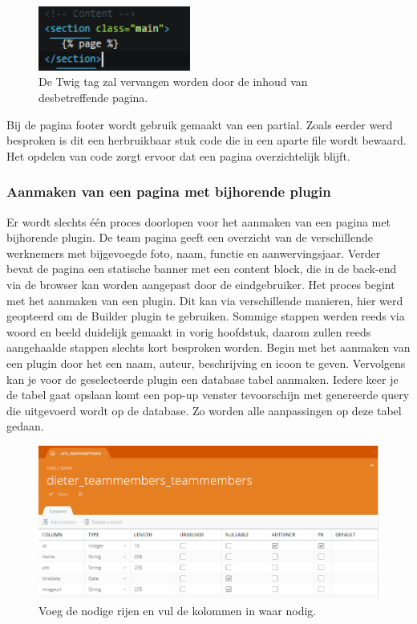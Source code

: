 \begin{figure}[!ht]
  \includegraphics[width=50mm]{img/oc-layout-page.png}
  \centering
  \caption{De Twig tag zal vervangen worden door de inhoud van desbetreffende pagina.}
  \label{fig:Variabele pagina-inhoud.}
\end{figure}

\noindent
Bij de pagina footer wordt gebruik gemaakt van een partial. Zoals eerder werd besproken is dit een herbruikbaar stuk code die in een aparte file wordt bewaard. Het opdelen van code zorgt ervoor dat een pagina overzichtelijk blijft. 


\subsubsection{Aanmaken van een pagina met bijhorende plugin}
Er wordt slechts één proces doorlopen voor het aanmaken van een pagina met bijhorende plugin. De team pagina geeft een overzicht van de verschillende werknemers met bijgevoegde foto, naam, functie en aanwervingsjaar. Verder bevat de pagina een statische banner met een content block, die in de back-end via de browser kan worden aangepast door de eindgebruiker. 
\newline\newline
Het proces begint met het aanmaken van een plugin. Dit kan via verschillende manieren, hier werd geopteerd om de Builder plugin te gebruiken. Sommige stappen werden reeds via woord en beeld duidelijk gemaakt in vorig hoofdstuk, daarom zullen reeds aangehaalde stappen slechts kort besproken worden. 
\newline\newline
Begin met het aanmaken van een plugin door het een naam, auteur, beschrijving en icoon te geven. Vervolgens kan je voor de geselecteerde plugin een database tabel aanmaken. Iedere keer je de tabel gaat opslaan komt een pop-up venster tevoorschijn met genereerde query die uitgevoerd wordt op de database. Zo worden alle aanpassingen op deze tabel gedaan. 

\begin{figure}[!ht]
  \includegraphics[width=\linewidth]{img/oc-plugin-teammember-db.png}
  \caption{Voeg de nodige rijen en vul de kolommen in waar nodig.}
  \label{fig:Teammember database tabel.}
\end{figure}

